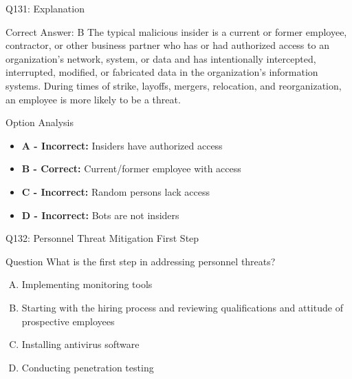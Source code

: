 \documentclass{beamer}
\begin{document}
	\begin{frame}{Q131: Explanation}
		\begin{block}{Correct Answer: B}
			The typical malicious insider is a current or former employee, contractor, or other business partner who has or had authorized access to an organization's network, system, or data and has intentionally intercepted, interrupted, modified, or fabricated data in the organization's information systems. During times of strike, layoffs, mergers, relocation, and reorganization, an employee is more likely to be a threat.
		\end{block}
		\begin{block}{Option Analysis}
			\begin{itemize}
				\item \textbf{A - Incorrect:} Insiders have authorized access
				\item \textbf{B - Correct:} Current/former employee with access
				\item \textbf{C - Incorrect:} Random persons lack access
				\item \textbf{D - Incorrect:} Bots are not insiders
			\end{itemize}
		\end{block}
	\end{frame}
	
	\begin{frame}{Q132: Personnel Threat Mitigation First Step}
		\begin{block}{Question}
			What is the first step in addressing personnel threats?
		\end{block}
		\begin{enumerate}[(A)]
			\item Implementing monitoring tools
			\item Starting with the hiring process and reviewing qualifications and attitude of prospective employees
			\item Installing antivirus software
			\item Conducting penetration testing
		\end{enumerate}
	\end{frame}
	
\end{document}
